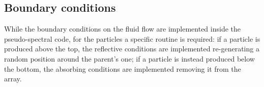 \subsection{Boundary conditions}
While the boundary conditions on the fluid flow are implemented inside the pseudo-spectral code, for the particles a specific routine is required:
if a particle is produced above the top, the reflective conditions are implemented re-generating a random position around the parent's one; if a particle is instead produced below the bottom, the absorbing conditions are implemented removing it from the array.
